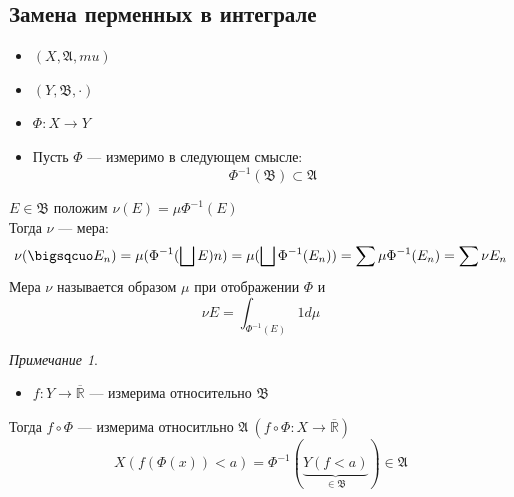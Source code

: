 \documentclass[oneside]{book}
\newcommand{\R}{\mathbb{R}}
\newcommand{\A}{\mathfrak{A}}
\newcommand{\B}{\mathfrak{B}}
\theoremstyle{plain}
\theoremstyle{remark}
\newtheorem*{remark}{Примечание}
\theoremstyle{definition}
\begin{document}
\subsection{Замена перменных в интеграле}
\label{sec:org63e16a8}
\begin{itemize}
\item \((X, \A, mu)\)
\item \((Y, \B, \cdot)\)
\item \(\Phi: X \to Y\)
\end{itemize}


\begin{itemize}
\item Пусть \(\Phi\) --- измеримо в следующем смысле:
\[ \Phi^{-1}(\B) \subset \A \]
\end{itemize}

 \(E \in \B\) положим \(\nu(E) = \mu \Phi^{-1}(E)\) \\
Тогда \(\nu\) --- мера:
\[ \nu(\bigsqcuo E_n) = \mu(\Phi^{-1}(\bigsqcup E)n) = \mu(\bigsqcup\Phi^{-1}(E_n)) = \sum \mu \Phi^{-1} (E_n) = \sum \nu E_n\]
Мера \(\nu\) называется образом \(\mu\) при отображении \(\Phi\) и
\[ \nu E = \int_{\Phi^{-1}(E)} 1 d\mu \]
\begin{remark}
\-
\begin{itemize}
\item \(f: Y \to \overline{\R}\) --- измерима относительно \(\B\)
\end{itemize}
Тогда \(f\circ \Phi\) --- измерима относитльно \(\A\ (f\circ \Phi: X\to\overline{\R})\)
\[ X(f(\Phi(x)) < a) = \Phi^{-1}(\underbrace{Y(f < a)}_{\in \B}) \in \A \]
\end{remark}
\end{document}
